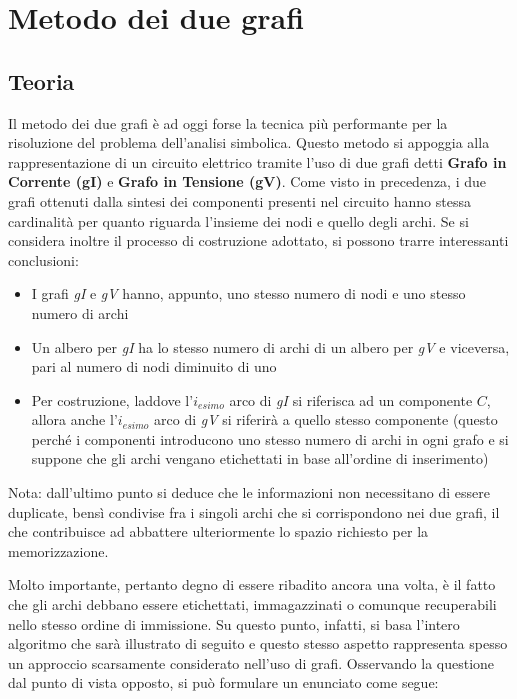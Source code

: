 \chapter{Metodo dei due grafi}

\section{Teoria}

Il metodo dei due grafi è ad oggi forse la tecnica più performante per la risoluzione del problema dell'analisi simbolica. Questo metodo si appoggia alla rappresentazione di un circuito elettrico tramite l'uso di due grafi detti \textbf{Grafo in Corrente (gI)} e \textbf{Grafo in Tensione (gV)}. Come visto in precedenza, i due grafi ottenuti dalla sintesi dei componenti presenti nel circuito hanno stessa cardinalità per quanto riguarda l'insieme dei nodi e quello degli archi. Se si considera inoltre il processo di costruzione adottato, si possono trarre interessanti conclusioni:
\begin{itemize}
 \item I grafi \textit{gI} e \textit{gV} hanno, appunto, uno stesso numero di nodi e uno stesso numero di archi
 \item Un albero per \textit{gI} ha lo stesso numero di archi di un albero per \textit{gV} e viceversa, pari al numero di nodi diminuito di uno
 \item Per costruzione, laddove l'$i_{esimo}$ arco di \textit{gI} si riferisca ad un componente $C$, allora anche l'$i_{esimo}$ arco di \textit{gV} si riferirà a quello stesso componente (questo perché i componenti introducono uno stesso numero di archi in ogni grafo e si suppone che gli archi vengano etichettati in base all'ordine di inserimento)
\end{itemize}
Nota: dall'ultimo punto si deduce che le informazioni non necessitano di essere duplicate, bensì condivise fra i singoli archi che si corrispondono nei due grafi, il che contribuisce ad abbattere ulteriormente lo spazio richiesto per la memorizzazione.

Molto importante, pertanto degno di essere ribadito ancora una volta, è il fatto che gli archi debbano essere etichettati, immagazzinati o comunque recuperabili nello stesso ordine di immissione. Su questo punto, infatti, si basa l'intero algoritmo che sarà illustrato di seguito e questo stesso aspetto rappresenta spesso un approccio scarsamente considerato nell'uso di grafi. Osservando la questione dal punto di vista opposto, si può formulare un enunciato come segue:

